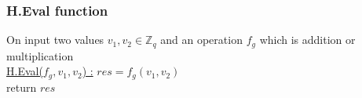 \subsubsection{H.Eval function}
On input two values $v_1, v_2 \in \mathbb{Z}_q$ and an operation $f_g$ which is addition or multiplication \\
\underline{H.Eval($f_g, v_1, v_2$) :} 
\tabNormal $res = f_g(v_1,v_2)$ \\
\tabNormal return $res$  \\
